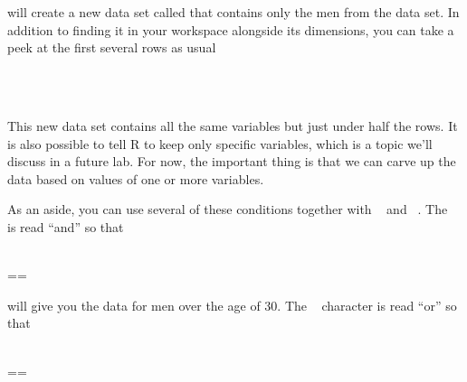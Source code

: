 \documentclass[11pt]{article}
\begin{document}
will create a new data set called \texttt{} that contains only the men from the \texttt{} data set.  In addition to finding it in your workspace alongside its dimensions, you can take a peek at the first several rows as usual

\ttfamily\noindent
\hlstd{}\hspace*{\fill}\\
\hlstd{}\hlkeyword{(}\hlkeyword{)}\hspace*{\fill}\\
\normalfont

This new data set contains all the same variables but just under half the rows. It is also possible to tell R to keep only specific variables, which is a topic we'll discuss in a future lab. For now, the important thing is that we can carve up the data based on values of one or more variables.

As an aside, you can use several of these conditions together with \texttt{{\ }\hlkeyword{\usebox{\hlnormalsizeboxand}}{\ }} and \texttt{{\ }\hlkeyword{|}{\ }}. The\texttt{{\ }\hlkeyword{\usebox{\hlnormalsizeboxand}}{\ }} is read ``and'' so that

\ttfamily\noindent
\hlstd{}\hspace*{\fill}\\
\hlstd{}\hlassignement{\usebox{\hlnormalsizeboxlessthan}-}{\ }\hlkeyword{(}\hlkeyword{,}{\ }\hlkeyword{\usebox{\hlnormalsizeboxdollar}}=={\ }\hlkeyword{\usebox{\hlnormalsizeboxand}}{\ }\hlkeyword{\usebox{\hlnormalsizeboxdollar}}\hlkeyword{\usebox{\hlnormalsizeboxgreaterthan}}{\ }\hlkeyword{)}\hspace*{\fill}\\
\normalfont

will give you the data for men over the age of 30. The \texttt{{\ }\hlkeyword{|}{\ }} character is read ``or'' so that

\ttfamily\noindent
\hlstd{}\hspace*{\fill}\\
\hlstd{}\hlassignement{\usebox{\hlnormalsizeboxlessthan}-}{\ }\hlkeyword{(}\hlkeyword{,}{\ }\hlkeyword{\usebox{\hlnormalsizeboxdollar}}=={\ }\hlkeyword{|}{\ }\hlkeyword{\usebox{\hlnormalsizeboxdollar}}\hlkeyword{\usebox{\hlnormalsizeboxgreaterthan}}{\ }\hlkeyword{)}\hspace*{\fill}\\
\normalfont
\end{document}
